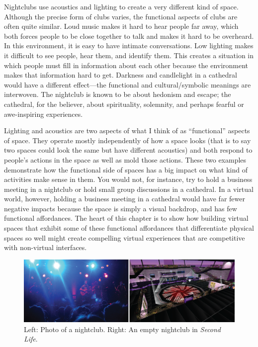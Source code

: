 Nightclubs use acoustics and lighting to create a very different kind of space. Although the precise form of clubs varies, the functional aspects of clubs are often quite similar. Loud music makes it hard to hear people far away, which both forces people to be close together to talk and makes it hard to be overheard. In this environment, it is easy to have intimate conversations. Low lighting makes it difficult to see people, hear them, and identify them. This creates a situation in which people must fill in information about each other because the environment makes that information hard to get. Darkness and candlelight in a cathedral would have a different effect---the functional and cultural/symbolic meanings are interwoven.  The nightclub is known to be about hedonism and escape; the cathedral, for the believer, about spirituality, solemnity, and perhaps fearful or awe-inspiring experiences.

Lighting and acoustics are two aspects of what I think of as ``functional'' aspects of space. They operate mostly independently of how a space looks (that is to say two spaces could look the same but have different acoustics) and both respond to people's actions in the space as well as mold those actions. These two examples demonstrate how the functional side of spaces has a big impact on what kind of activities make sense in them. You would not, for instance, try to hold a business meeting in a nightclub or hold small group discussions in a cathedral. In a virtual world, however, holding a business meeting in a cathedral would have far fewer negative impacts because the space is simply a visual backdrop, and has few functional affordances. The heart of this chapter is to show how building virtual spaces that exhibit some of these functional affordances that differentiate physical spaces so well might create compelling virtual experiences that are competitive with non-virtual interfaces.

\begin{figure}[t]
	\includegraphics{figures/club_comparison.png}
	\caption{Left: Photo of a nightclub. Right: An empty nightclub in \emph{Second Life}.}
	\label{fig:nightclub_comparison}
\end{figure}

